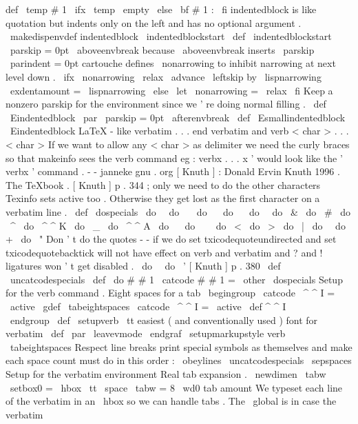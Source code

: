 {{{{def
\
temp
{
#
1
}
%
\
ifx
\
temp
\
empty
\
else
{
\
bf
#
1
:
}
%
\
fi
}
%
indentedblock
is
like
quotation
but
indents
only
on
the
left
and
%
has
no
optional
argument
.
%
\
makedispenvdef
{
indentedblock
}
{
\
indentedblockstart
}
%
\
def
\
indentedblockstart
{
%
{
\
parskip
=
0pt
\
aboveenvbreak
}
%
because
\
aboveenvbreak
inserts
\
parskip
\
parindent
=
0pt
%
%
cartouche
defines
\
nonarrowing
to
inhibit
narrowing
at
next
level
down
.
\
ifx
\
nonarrowing
\
relax
\
advance
\
leftskip
by
\
lispnarrowing
\
exdentamount
=
\
lispnarrowing
\
else
\
let
\
nonarrowing
=
\
relax
\
fi
}
%
Keep
a
nonzero
parskip
for
the
environment
since
we
'
re
doing
normal
filling
.
%
\
def
\
Eindentedblock
{
%
\
par
{
\
parskip
=
0pt
\
afterenvbreak
}
%
}
\
def
\
Esmallindentedblock
{
\
Eindentedblock
}
%
LaTeX
-
like
verbatim
.
.
.
end
verbatim
and
verb
{
<
char
>
.
.
.
<
char
>
}
%
If
we
want
to
allow
any
<
char
>
as
delimiter
%
we
need
the
curly
braces
so
that
makeinfo
sees
the
verb
command
eg
:
%
verbx
.
.
.
x
'
would
look
like
the
'
verbx
'
command
.
-
-
janneke
gnu
.
org
%
%
[
Knuth
]
:
Donald
Ervin
Knuth
1996
.
The
TeXbook
.
%
%
[
Knuth
]
p
.
344
;
only
we
need
to
do
the
other
characters
Texinfo
sets
%
active
too
.
Otherwise
they
get
lost
as
the
first
character
on
a
%
verbatim
line
.
\
def
\
dospecials
{
%
\
do
\
\
do
\
\
\
do
\
{
\
do
\
}
\
do
\
\
do
\
&
%
\
do
\
#
\
do
\
^
\
do
\
^
^
K
\
do
\
_
\
do
\
^
^
A
\
do
\
%
\
do
\
~
%
\
do
\
<
\
do
\
>
\
do
\
|
\
do
\
\
do
+
\
do
\
"
%
%
Don
'
t
do
the
quotes
-
-
if
we
do
set
txicodequoteundirected
and
%
set
txicodequotebacktick
will
not
have
effect
on
verb
and
%
verbatim
and
?
and
!
ligatures
won
'
t
get
disabled
.
%
\
do
\
\
do
\
'
%
}
%
%
[
Knuth
]
p
.
380
\
def
\
uncatcodespecials
{
%
\
def
\
do
#
#
1
{
\
catcode
#
#
1
=
\
other
}
\
dospecials
}
%
%
Setup
for
the
verb
command
.
%
%
Eight
spaces
for
a
tab
\
begingroup
\
catcode
\
^
^
I
=
\
active
\
gdef
\
tabeightspaces
{
\
catcode
\
^
^
I
=
\
active
\
def
^
^
I
{
\
\
\
\
\
\
\
\
}
}
\
endgroup
%
\
def
\
setupverb
{
%
\
tt
%
easiest
(
and
conventionally
used
)
font
for
verbatim
\
def
\
par
{
\
leavevmode
\
endgraf
}
%
\
setupmarkupstyle
{
verb
}
%
\
tabeightspaces
%
Respect
line
breaks
%
print
special
symbols
as
themselves
and
%
make
each
space
count
%
must
do
in
this
order
:
\
obeylines
\
uncatcodespecials
\
sepspaces
}
%
Setup
for
the
verbatim
environment
%
%
Real
tab
expansion
.
\
newdimen
\
tabw
\
setbox0
=
\
hbox
{
\
tt
\
space
}
\
tabw
=
8
\
wd0
%
tab
amount
%
%
We
typeset
each
line
of
the
verbatim
in
an
\
hbox
so
we
can
handle
%
tabs
.
The
\
global
is
in
case
the
verbatim
}}}
